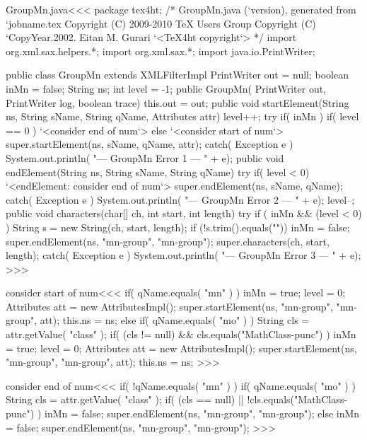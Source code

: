 \documentclass{article}
\begin{document}
 
\<GroupMn.java\><<< 
package tex4ht;
/* GroupMn.java (`version), generated from `jobname.tex
   Copyright (C) 2009-2010 TeX Users Group
   Copyright (C) `CopyYear.2002. Eitan M. Gurari
`<TeX4ht copyright`> */
import org.xml.sax.helpers.*; 
import org.xml.sax.*; 
import java.io.PrintWriter; 
 
public class GroupMn extends XMLFilterImpl { 
     PrintWriter out = null; 
     boolean inMn = false;
     String ns;
     int level = -1;
   public GroupMn( PrintWriter out, PrintWriter log, boolean trace){ 
     this.out = out; 
   } 
   public void startElement(String ns, String sName, 
                           String qName, Attributes attr) { 
      level++;
      try{ 
        if( inMn ){ 
           if( level == 0 ){ `<consider end of num`> }
        } else { `<consider start of num`> } 
        super.startElement(ns, sName, qName, attr); 
      } catch( Exception e ){
        System.out.println( "--- GroupMn Error 1 --- " + e);
      } 
   }   
   public void endElement(String ns, String sName, String qName){ 
      try{ 
        if( level < 0) { 
          `<endElement: consider end of num`>
        }
        super.endElement(ns, sName, qName); 
      } catch( Exception e ){
        System.out.println( "--- GroupMn Error 2 --- " + e);
      } 
      level--;
   }   
   public void characters(char[] ch, int start, int length){ 
      try{ 
        if ( inMn  && (level < 0) ) {
           String s = new String(ch, start, length);
           if (!s.trim().equals("")) {
             inMn = false;
             super.endElement(ns, "mn-group", "mn-group");
        }  }
        super.characters(ch, start, length); 
      } catch( Exception e ){
        System.out.println( "--- GroupMn Error 3 --- " + e);
}  }  } 
>>> 

\<consider start of num\><<<
if( qName.equals( "mn" ) ){
   inMn = true; level = 0;
   Attributes att = new AttributesImpl();
   super.startElement(ns, "mn-group", "mn-group", att); 
   this.ns = ns;
} else if( qName.equals( "mo" ) ){
   String cls = attr.getValue( "class" );
   if( (cls != null) && cls.equals("MathClass-punc") ){
      inMn = true; level = 0;
      Attributes att = new AttributesImpl();
      super.startElement(ns, "mn-group", "mn-group", att); 
      this.ns = ns;
}  }
>>>

\<consider end of num\><<<
if( !qName.equals( "mn" ) ){
  if( qName.equals( "mo" ) ){
     String cls = attr.getValue( "class" );
     if( (cls == null) || !cls.equals("MathClass-punc") ){
        inMn = false;  
        super.endElement(ns, "mn-group", "mn-group"); 
     }
  } else {
     inMn = false;
     super.endElement(ns, "mn-group", "mn-group"); 
} }
>>>
\end{document}
